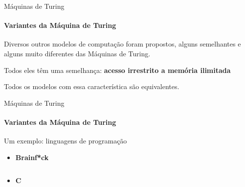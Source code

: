 \documentclass{beamer}
\begin{document}
\begin{frame}{Máquinas de Turing}
	\framesubtitle{Variantes da Máquina de Turing}
	Diversos outros modelos de computação foram propostos, alguns semelhantes e alguns muito diferentes das Máquinas de Turing.
	
	Todos eles têm uma semelhança: \textbf{acesso irrestrito a memória ilimitada}
	
	Todos os modelos com essa característica são equivalentes.
\end{frame}
\begin{frame}{Máquinas de Turing}
	\framesubtitle{Variantes da Máquina de Turing}
	Um exemplo: linguagens de programação
	\begin{itemize}
		\item \textbf{Brainf*ck}
		\inputminted{bf}{resources/brainfuck.bf}
		\item \textbf{C}
		\inputminted{c}{resources/c.c}
	\end{itemize}
\end{frame}
\end{document}
